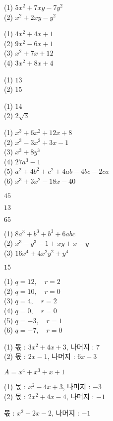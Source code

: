 \documentclass{oblivoir}
\begin{document}
\begin{minipage}{0.49\textwidth}
%
(1) \(5x^2+7xy-7y^2\)\\
(2) \(x^2+2xy-y^2\)

%
(1) \(4x^2+4x+1\)\\
(2) \(9x^2-6x+1\)\\
(3) \(x^2+7x+12\)\\
(4) \(3x^2+8x+4\)

%
(1) \(13\)\\
(2) \(15\)

%
(1) \(14\)\\
(2) \(2\sqrt3\)

%
(1) \(x^3+6x^2+12x+8\)\\
(2) \(x^3-3x^2+3x-1\)\\
(3) \(x^3+8y^3\)\\
(4) \(27a^3-1\)\\
(5) \(a^2+4b^2+c^2+4ab-4bc-2ca\)\\
(6) \(x^3+3x^2-18x-40\)

%
\(45\)

%
\(13\)

\end{minipage}
\begin{minipage}{0.49\textwidth}

%
\(65\)

%
(1) \(8a^3+b^3+b^3+6abc\)\\
(2) \(x^3-y^3-1+xy+x-y\)\\
(3) \(16x^4+4x^2y^2+y^4\)

%
\(15\)

%
(1) \(q=12,\quad r=2\)\\
(2) \(q=10,\quad r=0\)\\
(3) \(q=4,\quad r=2\)\\
(4) \(q=0,\quad r=0\)\\
(5) \(q=-3,\quad r=1\)\\
(6) \(q=-7,\quad r=0\)

%
(1) 몫 : \(3x^2+4x+3\), 나머지 : \(7\)\\
(2) 몫 : \(2x-1\), 나머지 : \(6x-3\)

%
\(A=x^4+x^3+x+1\)

%
(1) 몫 : \(x^2-4x+3\), 나머지 : \(-3\)\\
(2) 몫 : \(2x^2+4x-4\), 나머지 : \(-1\)

%
몫 : \(x^2+2x-2\), 나머지 : \(-1\)

\end{minipage}
\end{document}
